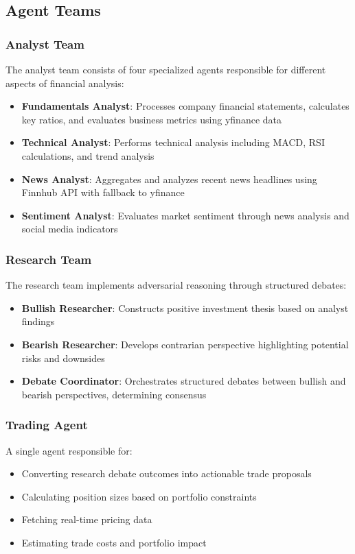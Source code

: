\documentclass[11pt,a4paper]{article}
\begin{document}
\subsection{Agent Teams}

\subsubsection{Analyst Team}
The analyst team consists of four specialized agents responsible for different aspects of financial analysis:

\begin{itemize}
    \item \textbf{Fundamentals Analyst}: Processes company financial statements, calculates key ratios, and evaluates business metrics using yfinance data
    \item \textbf{Technical Analyst}: Performs technical analysis including MACD, RSI calculations, and trend analysis
    \item \textbf{News Analyst}: Aggregates and analyzes recent news headlines using Finnhub API with fallback to yfinance
    \item \textbf{Sentiment Analyst}: Evaluates market sentiment through news analysis and social media indicators
\end{itemize}

\subsubsection{Research Team}
The research team implements adversarial reasoning through structured debates:

\begin{itemize}
    \item \textbf{Bullish Researcher}: Constructs positive investment thesis based on analyst findings
    \item \textbf{Bearish Researcher}: Develops contrarian perspective highlighting potential risks and downsides
    \item \textbf{Debate Coordinator}: Orchestrates structured debates between bullish and bearish perspectives, determining consensus
\end{itemize}

\subsubsection{Trading Agent}
A single agent responsible for:
\begin{itemize}
    \item Converting research debate outcomes into actionable trade proposals
    \item Calculating position sizes based on portfolio constraints
    \item Fetching real-time pricing data
    \item Estimating trade costs and portfolio impact
\end{itemize}
\end{document}
